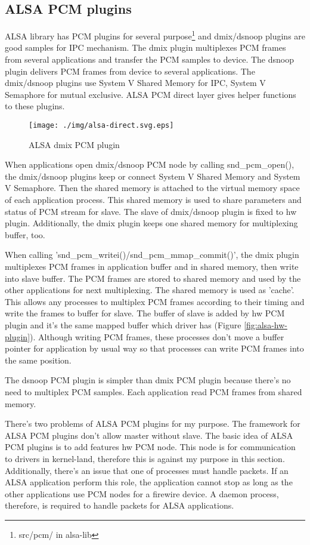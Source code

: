 \documentclass[onecolumn]{article}
\begin{document}
\subsection{ALSA PCM plugins}
ALSA library has PCM plugins for several purpose\footnote{src/pcm/ in alsa-lib} and dmix/dsnoop plugins are good samples for IPC mechanism. The dmix plugin multiplexes PCM frames from several applications and transfer the PCM samples to device. The dsnoop plugin delivers PCM frames from device to several applications. The dmix/dsnoop plugins use System V Shared Memory for IPC, System V Semaphore for mutual exclusive. ALSA PCM direct layer gives helper functions to these plugins.

\begin{figure}[htbp]
	\centering
	\texttt{[image: ./img/alsa-direct.svg.eps]}
	\caption{ALSA dmix PCM plugin}
	\label{alsa_direct}
\end{figure}


When applications open dmix/dsnoop PCM node by calling snd\_pcm\_open(), the dmix/dsnoop plugins keep or connect System V Shared Memory and System V Semaphore. Then the shared memory is attached to the virtual memory space of each application process. This shared memory is used to share parameters and status of PCM stream for slave. The slave of dmix/dsnoop plugin is fixed to hw plugin. Additionally, the dmix plugin keeps one shared memory for multiplexing buffer, too.

When calling 'snd\_pcm\_writei()/snd\_pcm\_mmap\_commit()', the dmix plugin multiplexes PCM frames in application buffer and in shared memory, then write into slave buffer. The PCM frames are stored to shared memory and used by the other applications for next multiplexing. The shared memory is used as 'cache'. This allows any processes to multiplex PCM frames according to their timing and write the frames to buffer for slave. The buffer of slave is added by hw PCM plugin and it's the same mapped buffer which driver has (Figure \ref{fig:alsa-hw-plugin}). Although writing PCM frames, these processes don't move a buffer pointer for application by usual way so that processes can write PCM frames into the same position.

The dsnoop PCM plugin is simpler than dmix PCM plugin because there's no need to multiplex PCM samples. Each application read PCM frames from shared memory.

There's two problems of ALSA PCM plugins for my purpose. The framework for ALSA PCM plugins don't allow master without slave. The basic idea of ALSA PCM plugins is to add features hw PCM node. This node is for communication to drivers in kernel-land, therefore this is against my purpose in this section. Additionally, there's an issue that one of processes must handle packets. If an ALSA application perform this role, the application cannot stop as long as the other applications use PCM nodes for a firewire device. A daemon process, therefore, is required to handle packets for ALSA applications.
\end{document}
